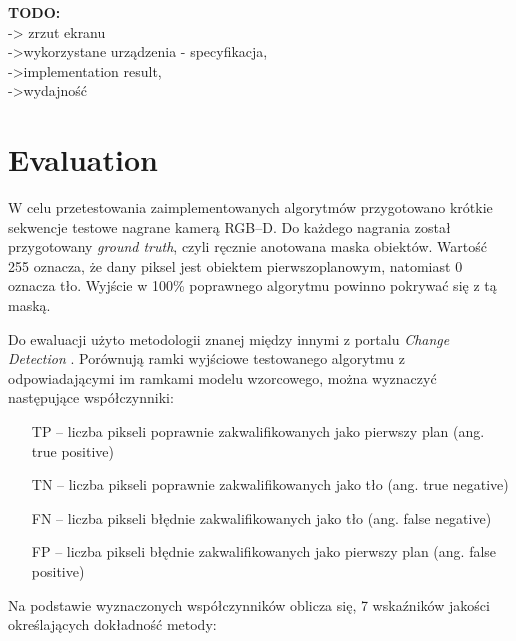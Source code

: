 \documentclass[b5paper,10pt,twoside]{article}
\begin{document}
{\textbf{TODO:}\\
-> zrzut ekranu\\
->wykorzystane urządzenia - specyfikacja,\\
->implementation result,\\
->wydajność


\section{Evaluation}

W celu przetestowania zaimplementowanych algorytmów przygotowano krótkie sekwencje testowe nagrane kamerą RGB--D. Do każdego nagrania został przygotowany \textit{ground truth}, czyli ręcznie anotowana maska obiektów. Wartość 255 oznacza, że dany piksel jest obiektem pierwszoplanowym, natomiast 0 oznacza tło. Wyjście w 100\% poprawnego algorytmu powinno pokrywać się z tą maską. 

Do ewaluacji użyto metodologii znanej między innymi z portalu \textit{Change Detection} \cite{}. Porównują ramki wyjściowe testowanego algorytmu z odpowiadającymi im ramkami modelu wzorcowego, można wyznaczyć następujące współczynniki:

\begin{enumerate}
\item[TP] – liczba pikseli poprawnie zakwalifikowanych jako pierwszy plan (ang. true positive)
\item[TN] – liczba pikseli poprawnie zakwalifikowanych jako tło (ang. true negative)
\item[FN] – liczba pikseli błędnie zakwalifikowanych jako tło (ang. false negative)
\item[FP] – liczba pikseli błędnie zakwalifikowanych jako pierwszy plan (ang. false positive)
\end{enumerate}

\noindent Na podstawie wyznaczonych współczynników oblicza się, 7 wskaźników jakości określających dokładność metody:

}
\end{document}
